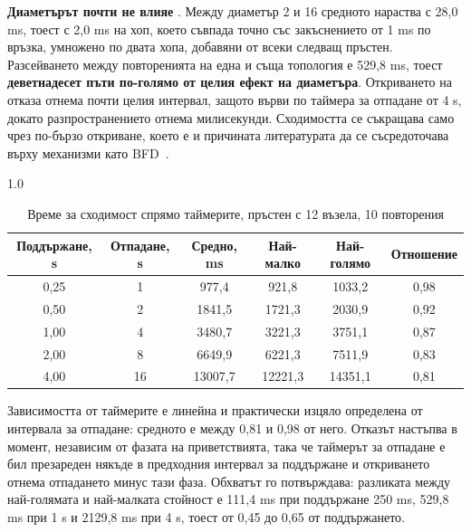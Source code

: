 \textbf{Диаметърът почти не влияе} . Между диаметър 2 и 16 средното
нараства с 28,0 ms, тоест с 2,0 ms на хоп, което съвпада точно със закъснението от 1 ms по
връзка, умножено по двата хопа, добавяни от всеки следващ пръстен. Разсейването между
повторенията на една и съща топология е 529,8 ms, тоест \textbf{деветнадесет пъти по-голямо от
целия ефект на диаметъра}. Откриването на отказа отнема почти целия интервал, защото върви по
таймера за отпадане от 4 s, докато разпространението отнема милисекунди. Сходимостта се
съкращава само чрез по-бързо откриване, което е и причината литературата да се съсредоточава
върху механизми като BFD~\cite{rfc5880}.

\begin{table}[!htb]
\caption{Време за сходимост спрямо таймерите, пръстен с 12 възела, 10 повторения}
\label{tab:timers}
\centering
\fontsize{10}{12}\selectfont
\begin{spacing}{1.0}
\begin{tabular}{cccccc}
\toprule
Поддържане, s & Отпадане, s & Средно, ms & Най-малко & Най-голямо & Отношение \\
\midrule
0,25 & 1  & 977,4    & 921,8    & 1033,2   & 0,98 \\
0,50 & 2  & 1841,5   & 1721,3   & 2030,9   & 0,92 \\
1,00 & 4  & 3480,7   & 3221,3   & 3751,1   & 0,87 \\
2,00 & 8  & 6649,9   & 6221,3   & 7511,9   & 0,83 \\
4,00 & 16 & 13007,7  & 12221,3  & 14351,1  & 0,81 \\
\bottomrule
\end{tabular}
\end{spacing}
\end{table}

Зависимостта от таймерите  е линейна и практически изцяло определена от
интервала за отпадане: средното е между 0,81 и 0,98 от него. Отказът настъпва в момент,
независим от фазата на приветствията, така че таймерът за отпадане е бил презареден някъде в
предходния интервал за поддържане и откриването отнема отпадането минус тази фаза. Обхватът го
потвърждава: разликата между най-голямата и най-малката стойност е 111,4 ms при поддържане
250 ms, 529,8 ms при 1 s и 2129,8 ms при 4 s, тоест от 0,45 до 0,65 от поддържането.

